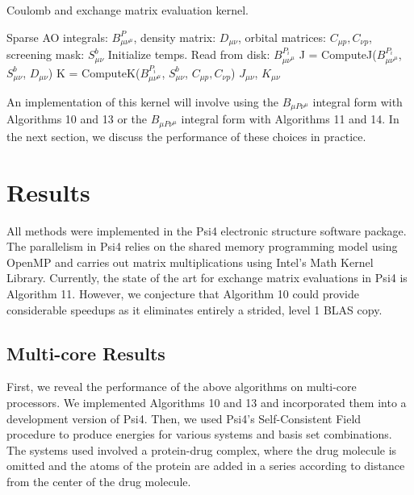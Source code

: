 \begin{algorithm}[H]
\caption{Coulomb and exchange matrix evaluation kernel.}
\begin{algorithmic}
\REQUIRE Sparse AO integrals: $B^P_{\mu \nu^{\mu}}$, density matrix: $D_{\mu \nu}$, orbital matrices: $C_{\mu p}, C_{\nu p}$, screening mask: $S_{\mu \nu}^b$
\STATE Initialize temps.
    \STATE Read from disk: $B^{P_i}_{\mu \nu^{\mu}}$
    \STATE J = ComputeJ($B^{P_i}_{\mu \nu^{\mu}}$, $S_{\mu \nu}^b$, $D_{\mu \nu}$)
    \STATE K = ComputeK($B^{P_i}_{\mu \nu^{\mu}}$, $S_{\mu \nu}^b$, $C_{\mu p}, C_{\nu p}$)
\ENDFOR
\RETURN $J_{\mu \nu}$, $K_{\mu \nu}$
\end{algorithmic}
\end{algorithm}

\noindent An implementation of this kernel will involve using the $B_{\mu P \nu^\mu}$ integral form with Algorithms 10 and 13 or the 
$B_{\mu P \nu^\mu}$ integral form with Algorithms 11 and 14. In the next section, we discuss the performance of these choices in practice.

\section{Results}

All methods were implemented in the {\sc Psi4} electronic structure software package.
The parallelism in {\sc Psi4} relies on the shared memory programming model using OpenMP 
and carries out matrix multiplications using Intel's Math Kernel
Library. Currently, the state of the art for exchange matrix evaluations in
{\sc Psi4} is Algorithm 11. However, we conjecture that Algorithm 10 could provide 
considerable speedups as it eliminates entirely a strided, level 1 BLAS copy. 

\subsection{Multi-core Results}

First, we reveal the performance of the above algorithms on multi-core processors.
We implemented Algorithms 10 and 13 and incorporated them into a development version of {\sc Psi4}. 
Then, we used {\sc Psi4}'s Self-Consistent Field
procedure to produce energies for various systems and basis set combinations. The systems used involved a protein-drug complex,
where the drug molecule is omitted and the atoms of the protein are added in a series according to distance from the center of
the drug molecule. 

